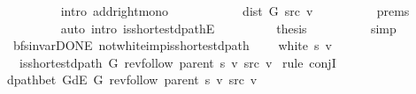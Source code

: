 \begin{isabellebody}
\ \ \ \ \ \ \ \ \isamarkupfalse%
\ {\isacharparenleft}{\kern0pt}intro\ add{\isacharunderscore}{\kern0pt}right{\isacharunderscore}{\kern0pt}mono{\isacharparenright}{\kern0pt}\isanewline
\ \ \ \ \ \ \isamarkupfalse%
\ \isamarkupfalse%
\ {\isachardoublequoteopen}{\isachardot}{\kern0pt}{\isachardot}{\kern0pt}{\isachardot}{\kern0pt}\ {\isacharequal}{\kern0pt}\ dist\ G\ src\ v{\isachardoublequoteclose}\isanewline
\ \ \ \ \ \ \ \ \isamarkupfalse%
\ {\isachardoublequoteopen}{}{\isachardot}{\kern0pt}prems{\isachardoublequoteclose}{\isacharparenleft}{\kern0pt}{}{\isacharparenright}{\kern0pt}\isanewline
\ \ \ \ \ \ \ \ \isamarkupfalse%
\ {\isacharparenleft}{\kern0pt}auto\ intro{\isacharcolon}{\kern0pt}\ is{\isacharunderscore}{\kern0pt}shortest{\isacharunderscore}{\kern0pt}dpathE{\isacharunderscore}{\kern0pt}{}{\isacharparenright}{\kern0pt}\isanewline
\ \ \ \ \ \ \isamarkupfalse%
\ \isamarkupfalse%
\ {\isacharquery}{\kern0pt}thesis\isanewline
\ \ \ \ \ \ \ \ \isamarkupfalse%
\ simp\isanewline
\ \ \ \ \isamarkupfalse%
\isanewline
\ \ \isamarkupfalse%
\isanewline
{}\isamarkupfalse%
%
\endisatagproof
{\isafoldproof}%
%
\isadelimproof
\isanewline
%
\endisadelimproof
\isanewline
{}\isamarkupfalse%
\ {\isacharparenleft}{\kern0pt}\ bfs{\isacharunderscore}{\kern0pt}invar{\isacharunderscore}{\kern0pt}DONE{\isacharparenright}{\kern0pt}\ not{\isacharunderscore}{\kern0pt}white{\isacharunderscore}{\kern0pt}imp{\isacharunderscore}{\kern0pt}is{\isacharunderscore}{\kern0pt}shortest{\isacharunderscore}{\kern0pt}dpath{\isacharcolon}{\kern0pt}\isanewline
\ \ \ {\isachardoublequoteopen}{\isasymnot}\ white\ s\ v{\isachardoublequoteclose}\isanewline
\ \ \ {\isachardoublequoteopen}is{\isacharunderscore}{\kern0pt}shortest{\isacharunderscore}{\kern0pt}dpath\ G\ {\isacharparenleft}{\kern0pt}rev{\isacharunderscore}{\kern0pt}follow\ {\isacharparenleft}{\kern0pt}parent\ s{\isacharparenright}{\kern0pt}\ v{\isacharparenright}{\kern0pt}\ src\ v{\isachardoublequoteclose}\isanewline
%
\isadelimproof
%
\endisadelimproof
%
\isatagproof
{}\isamarkupfalse%
\ {\isacharparenleft}{\kern0pt}rule\ conjI{\isacharparenright}{\kern0pt}\isanewline
\ \ \isamarkupfalse%
\ {\isachardoublequoteopen}dpath{\isacharunderscore}{\kern0pt}bet\ {\isacharparenleft}{\kern0pt}G{\isachardot}{\kern0pt}dE\ G{\isacharparenright}{\kern0pt}\ {\isacharparenleft}{\kern0pt}rev{\isacharunderscore}{\kern0pt}follow\ {\isacharparenleft}{\kern0pt}parent\ s{\isacharparenright}{\kern0pt}\ v{\isacharparenright}{\kern0pt}\ src\ v{\isachardoublequoteclose}\isanewline

\end{isabellebody}
